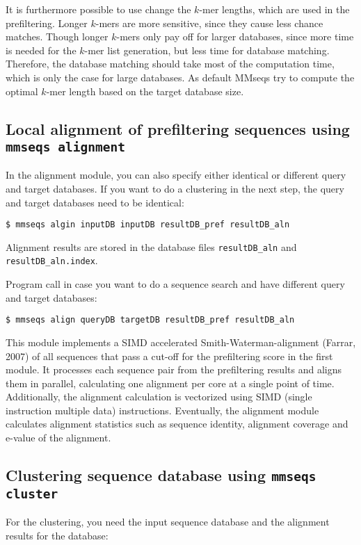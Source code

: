 \documentclass[11pt,a4paper]{scrreprt}
\begin{document}
It is furthermore possible to use change the $k$-mer lengths, which are used in the prefiltering. Longer $k$-mers are more sensitive, since they cause less chance matches. Though longer $k$-mers only pay off for larger databases, since more time is needed for the $k$-mer list generation, but less time for database matching. Therefore, the database matching should take most of the computation time, which is only the case for large databases. As default MMseqs try to compute the optimal $k$-mer length based on the target database size.
\subsection{Local alignment of prefiltering sequences using \texttt{mmseqs alignment}}
In the alignment module, you can also specify either identical or different query and target databases. If you want to do a clustering in the next step, the query and target databases need to be identical:

\begin{verbatim}
$ mmseqs algin inputDB inputDB resultDB_pref resultDB_aln 
\end{verbatim}

Alignment results are stored in the database files \texttt{resultDB\_aln} and \texttt{resultDB\_aln.index}.

Program call in case you want to do a sequence search and have different query and target databases:

\begin{verbatim}
$ mmseqs align queryDB targetDB resultDB_pref resultDB_aln 
\end{verbatim}

This module implements a SIMD accelerated Smith-Waterman-alignment (Farrar, 2007) of all sequences that pass a cut-off for the prefiltering score in the first module. It processes each sequence pair from the prefiltering results and aligns them in parallel, calculating one alignment per core at a single point of time. Additionally, the alignment calculation is vectorized using SIMD (single instruction multiple data) instructions. Eventually, the alignment module calculates alignment statistics such as sequence identity, alignment coverage and e-value of the alignment.
\subsection{Clustering sequence database using \texttt{mmseqs cluster}} \label{sub:Clustering_module}
For the clustering, you need the input sequence database and the alignment results for the database:
\end{document}
